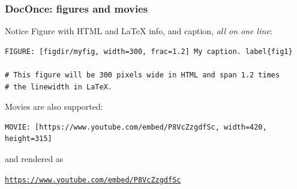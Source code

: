 \documentclass{beamer}
\newenvironment{doconce:movie}{}{}
\newcounter{doconce:movie:counter}
\begin{document}
\begin{frame}
\frametitle{DocOnce: figures and movies}

\begin{block}{Notice}
Figure with HTML and {\LaTeX} info, and caption, \emph{all on one line}:
\end{block}






\begin{verbatim}
FIGURE: [figdir/myfig, width=300, frac=1.2] My caption. label{fig1}

# This figure will be 300 pixels wide in HTML and span 1.2 times
# the linewidth in LaTeX.

\end{verbatim}


Movies are also supported:



\begin{verbatim}
MOVIE: [https://www.youtube.com/embed/P8VcZzgdfSc, width=420, height=315]

\end{verbatim}

and rendered as


\begin{doconce:movie}
\begin{center}
\href{{https://www.youtube.com/embed/P8VcZzgdfSc}}{\nolinkurl{https://www.youtube.com/embed/P8VcZzgdfSc}}
\end{center}
\end{doconce:movie}
\end{frame}
\end{document}
